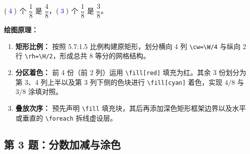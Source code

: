 \vspace{0.5cm}
\begin{center}

\vspace{0.4cm}
{\Large $(\;\textcolor{blue}{4}\;)$ 个 $\dfrac{1}{8}$ 是 $\dfrac{4}{8}$，$(\;\textcolor{blue}{3}\;)$ 个 $\dfrac{1}{8}$ 是 $\dfrac{3}{8}$。}
\end{center}

\vspace{0.5cm}
\textbf{绘图原理：}
\begin{enumerate}
    \item \textbf{矩形比例：} 按照 5.7:1.5 比例构建原矩形，划分横向 4 列 \texttt{\textbackslash cw=\textbackslash W/4} 与纵向 2 行 \texttt{\textbackslash rh=\textbackslash H/2}，形成总共 8 等分的网格结构。
    \item \textbf{分区着色：} 前 4 份（前 2 列）运用 \texttt{\textbackslash fill[red]} 填充为红。其余 3 份划分为第 3、4 列上半以及第 3 列下侧的色块进行 \texttt{\textbackslash fill[cyan]} 着色，实现 $4/8$ 与 $3/8$ 涂填对照。
    \item \textbf{叠放次序：} 预先声明 \texttt{\textbackslash fill} 填充块，其后再添加深色矩形框架边界以及水平或垂直的 \texttt{\textbackslash foreach} 拆线虚设层。
\end{enumerate}

\vspace{1.5cm}

\newpage

\subsection{第 3 题：分数加减与涂色}

